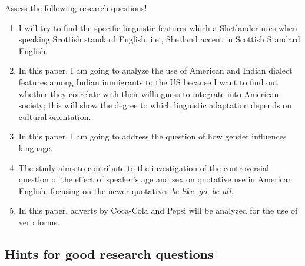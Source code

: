 \documentclass[
  11pt,
  letterpaper,
  DIV=11,
  numbers=noendperiod]{scrreprt}
\begin{document}
\begin{tcolorbox}[enhanced jigsaw, toprule=.15mm, opacitybacktitle=0.6, coltitle=black, arc=.35mm, colback=white, title=\textcolor{quarto-callout-caution-color}{\faFire}\hspace{0.5em}{Task}, titlerule=0mm, toptitle=1mm, bottomtitle=1mm, breakable, rightrule=.15mm, opacityback=0, bottomrule=.15mm, leftrule=.75mm, colframe=quarto-callout-caution-color-frame, left=2mm, colbacktitle=quarto-callout-caution-color!10!white]

Assess the following research questions!

\begin{enumerate}
\def\labelenumi{(\alph{enumi})}
\item
  I will try to find the specific linguistic features which a Shetlander
  uses when speaking Scottish standard English, i.e., Shetland accent in
  Scottish Standard English.
\item
  In this paper, I am going to analyze the use of American and Indian
  dialect features among Indian immigrants to the US because I want to
  find out whether they correlate with their willingness to integrate
  into American society; this will show the degree to which linguistic
  adaptation depends on cultural orientation.
\item
  In this paper, I am going to address the question of how gender
  influences language.
\item
  The study aims to contribute to the investigation of the controversial
  question of the effect of speaker's age and sex on quotative use in
  American English, focusing on the newer quotatives \emph{be like},
  \emph{go}, \emph{be all}.
\item
  In this paper, adverts by Coca-Cola and Pepsi will be analyzed for the
  use of verb forms.
\end{enumerate}

\end{tcolorbox}

\subsection{Hints for good research
questions}\label{hints-for-good-research-questions}
\end{document}
